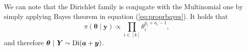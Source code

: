 We can note that the Dirichlet family is conjugate with the Multinomial one by simply applying Bayes theorem in equation (\ref{eq:proprbayes}). It holds that
\begin{equation*}
\pi(\bm{\theta}\;|\;\bm{y})\propto \prod_{i\in[k]} \theta_i^{y_i+a_i-1},
\end{equation*}
and therefore $\bm{\theta}~|~\bm{Y}\sim \textnormal{Di}(\bm{a}+\bm{y})$. 

\label{sec:multidir}
\begin{comment}
\subsection{Contingency Tables}
\label{appendixE13}
We now consider the case of $n$ distinct discrete random variables, also called in this context classification criteria. Assume these have index in $[n]$ and, for $i\in[n]$, one of these random variables takes values in a discrete finite space $\mathcal{Y}_i$. Assume a sample is collected from these variables and the results are summarised in a table such that a cell is a point $i=(j_j)_{j\in[n]}$, where $i\in \bm{\mathcal{Y}}=\bigtimes_{j\in[n]}\mathcal{Y}_j$. Let $y_i\in\mathbb{Z}_{\geq 0}$ be the number of observations in cell $i$ and let $n=\sum_{i\in \bm{\mathcal{Y}}}y_i$. A marginal table is one where observations are allocated to cell according to a subset $A\subseteq[n]$ of the random variables. A marginal cell is defined as $i_A=(i_j)_{j\in A}$, where $i_a\in \bm{\mathcal{Y}}_A=\bigtimes_{j\in A}\mathcal{Y}_j$. The corresponding marginal counts are defined as $y_{i_A}=\sum_{j:j_A=i_A}y_j$, $i_a\in\bm{\mathcal{Y}}_A$.

Define $\theta_i\in[0,1]$, $i\in\bm{\mathcal{Y}}$, as the probability that an observation belongs to cell $i$ and let  $\sum_{i\in\bm{\mathcal{Y}}}\theta_i=1$. The joint distribution for the entire table is then multinomial and, letting $\bm{Y}$ be the associated random vector, we have that the density can be written as
\begin{equation}
f(\bm{y}\;|\;\bm{\theta})=\binom{n}{\bm{y}}\prod_{i\in\bm{\mathcal{Y}}}\theta_i^{y_i},
\end{equation}
with $\bm{\theta}=(\theta_i)_{i\in\bm{\mathcal{Y}}}$. The marginal probabilities are defined similarly to marginal cell counts as, for $i_A\in\bm{\mathcal{Y}}_A$,
\begin{equation}
\theta_{i_A}=\sum_{j:j_A=i_A}\theta_j.
\end{equation}
Note that the joint distribution over any marginal cell is again multinomial. 


\end{comment}
